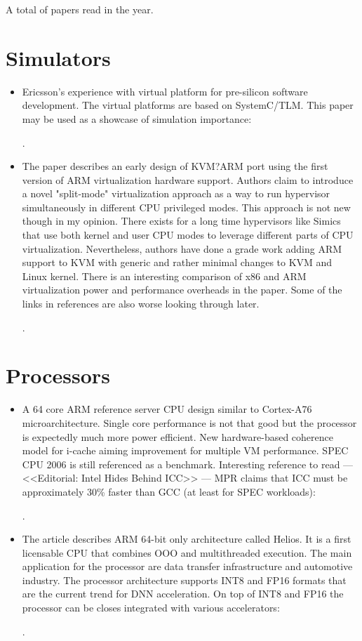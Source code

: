 



A total of  papers read in the year.

\section*{Simulators}

\begin{itemize}
    \item Ericsson's experience with virtual platform for pre-silicon software development. The virtual platforms are based on SystemC/TLM. This paper may be used as a showcase of simulation importance:

    \cite{Dahl:Ericsson-VP:2016}.

    \item The paper describes an early design of KVM?ARM port using the first version of ARM virtualization hardware support. Authors claim to introduce a novel "split-mode" virtualization approach as a way to run hypervisor simultaneously in different CPU privileged modes. This approach is not new though in my opinion. There exists for a long time hypervisors like Simics that use both kernel and user CPU modes to leverage different parts of CPU virtualization. Nevertheless, authors have done a grade work adding ARM support to KVM with generic and rather minimal changes to KVM and Linux kernel. There is an interesting comparison of x86 and ARM virtualization power and performance overheads in the paper. Some of the links in references are also worse looking through later.

    \cite{Dall:KVM-ARM:2014}.
\end{itemize}

\section*{Processors}
\begin{itemize}
    \item A 64 core ARM reference server CPU design similar to Cortex-A76 microarchitecture. Single core performance is not that good but the processor is expectedly much more power efficient. New hardware-based coherence model for i-cache aiming improvement for multiple VM performance. SPEC CPU 2006 is still referenced as a benchmark. Interesting reference to read --- <<Editorial: Intel Hides Behind ICC>> --- MPR claims that ICC must be approximately 30\% faster than GCC (at least for SPEC workloads):

    \cite{Gwennap:ARM-Neoverse:2019}.

    \item The article describes ARM 64-bit only architecture called Helios. It is a first licensable CPU that combines OOO and multithreaded execution. The main application for the processor are data transfer infrastructure and automotive industry. The processor architecture supports INT8 and FP16 formats that are the current trend for DNN acceleration. On top of INT8 and FP16 the processor can be closes integrated with various accelerators:

    \cite{Demler:Helios:2019}.
\end{itemize}

